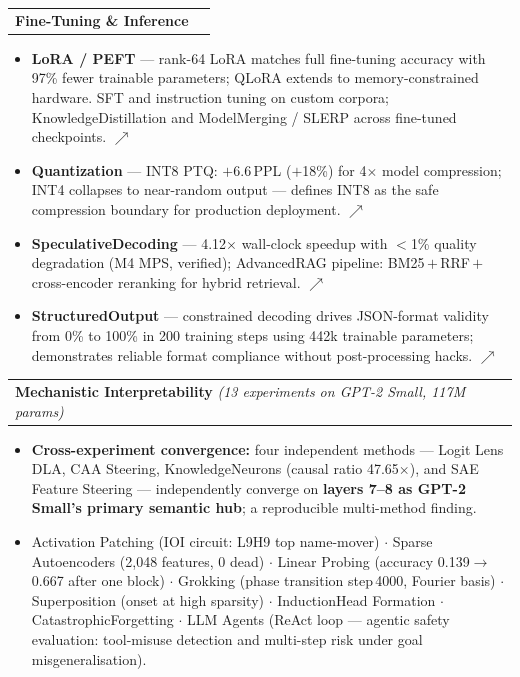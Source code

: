 \documentclass[letterpaper,11pt]{article}
\makeatletter
\newcommand{\resumeItem}[1]{
  \item\small{#1 \vspace{-2pt}}
}
\newcommand{\resumeProjectHeading}[2]{
  \item
    \begin{tabular*}{0.97\textwidth}{l@{\extracolsep{\fill}}r}
      \small#1 & #2 \\
    \end{tabular*}\vspace{-7pt}
}
\newcommand{\resumeItemListStart}{\begin{itemize}}
\newcommand{\resumeItemListEnd}{\end{itemize}\vspace{-5pt}}
\makeatother
\begin{document}
  \resumeProjectHeading
    {\textbf{Fine-Tuning \& Inference}}{}
    \resumeItemListStart
      \resumeItem{\textbf{LoRA / PEFT} — rank-64 LoRA matches full
        fine-tuning accuracy with 97\% fewer trainable parameters;
        QLoRA extends to memory-constrained hardware. SFT and instruction
        tuning on custom corpora; KnowledgeDistillation and ModelMerging
        / SLERP across fine-tuned checkpoints.
        \href{https://github.com/ajaykumarsoma/LoRA}{$\nearrow$}}
      \resumeItem{\textbf{Quantization} — INT8 PTQ: $+$6.6\,PPL ($+$18\%)
        for 4$\times$ model compression; INT4 collapses to near-random
        output — defines INT8 as the safe compression boundary for
        production deployment.
        \href{https://github.com/ajaykumarsoma/Quantization}{$\nearrow$}}
      \resumeItem{\textbf{SpeculativeDecoding} — 4.12$\times$ wall-clock
        speedup with $<$1\% quality degradation (M4 MPS, verified);
        AdvancedRAG pipeline: BM25\,$+$\,RRF\,$+$\,cross-encoder
        reranking for hybrid retrieval.
        \href{https://github.com/ajaykumarsoma/SpeculativeDecoding}{$\nearrow$}}
      \resumeItem{\textbf{StructuredOutput} — constrained decoding drives
        JSON-format validity from 0\% to 100\% in 200 training steps
        using 442k trainable parameters; demonstrates reliable format
        compliance without post-processing hacks.
        \href{https://github.com/ajaykumarsoma/StructuredOutput}{$\nearrow$}}
    \resumeItemListEnd

  \resumeProjectHeading
    {\textbf{Mechanistic Interpretability}
      \emph{(13 experiments on GPT-2 Small, 117M params)}}{}
    \resumeItemListStart
      \resumeItem{\textbf{Cross-experiment convergence:} four independent
        methods — Logit Lens DLA, CAA Steering, KnowledgeNeurons (causal
        ratio 47.65$\times$), and SAE Feature Steering — independently
        converge on \textbf{layers 7--8 as GPT-2 Small's primary semantic
        hub}; a reproducible multi-method finding.}
      \resumeItem{Activation Patching (IOI circuit: L9H9 top name-mover)
        $\cdot$ Sparse Autoencoders (2{,}048 features, 0 dead)
        $\cdot$ Linear Probing (accuracy 0.139$\to$0.667 after one block)
        $\cdot$ Grokking (phase transition step\,4000, Fourier basis)
        $\cdot$ Superposition (onset at high sparsity)
        $\cdot$ InductionHead Formation $\cdot$ CatastrophicForgetting
        $\cdot$ LLM Agents (ReAct loop — agentic safety evaluation:
        tool-misuse detection and multi-step risk under goal
        misgeneralisation).}
    \resumeItemListEnd
\end{document}
